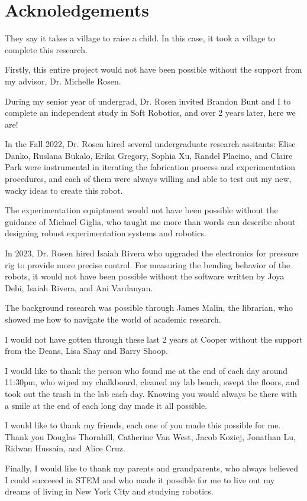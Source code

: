 \section{Acknoledgements}

They say it takes a village to raise a child. In this case, it took a village to complete this research. 

Firstly, this entire project would not have been possible without the support from my advisor, Dr. Michelle Rosen. 

During my senior year of undergrad, Dr. Rosen invited Brandon Bunt and I to complete an independent study in Soft Robotics, and over 2 years later, here we are!

In the Fall 2022, Dr. Rosen hired several undergraduate research assitants: Elise Danko, Ruslana Bukalo, Erika Gregory, Sophia Xu, Randel Placino, and Claire Park were instrumental in iterating the fabrication process and experimentation procedures, and each of them were always willing and able to test out my new, wacky ideas to create this robot. 

The experimentation equiptment would not have been possible without the guidance of Michael Giglia, who taught me more than words can describe about designing robust experimentation systems and robotics.

In 2023, Dr. Rosen hired Isaiah Rivera who upgraded the electronics for pressure rig to provide more precise control. For measuring the bending behavior of the robots, it would not have been possible without the software written by Joya Debi, Isaiah Rivera, and Ani Vardanyan. 

The background research was possible through James Malin, the librarian, who showed me how to navigate the world of academic research. 

I would not have gotten through these last 2 years at Cooper without the support from the Deans, Lisa Shay and Barry Shoop. 

I would like to thank the person who found me at the end of each day around 11:30pm, who wiped my chalkboard, cleaned my lab bench, swept the floors, and took out the trash in the lab each day. Knowing you would always be there with a smile at the end of each long day made it all possible. 

I would like to thank my friends, each one of you made this possible for me. Thank you Douglas Thornhill, Catherine Van West, Jacob Koziej, Jonathan Lu, Ridwan Hussain, and Alice Cruz. 

Finally, I would like to thank my parents and grandparents, who always believed I could succeeed in STEM and who made it possible for me to live out my dreams of living in New York City and studying robotics. 